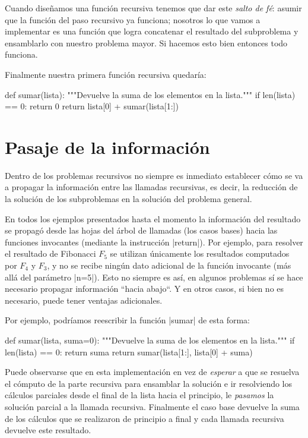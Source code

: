 Cuando diseñamos una función recursiva tenemos que dar este \emph{salto de fé}:
asumir que la función del paso recursivo ya funciona; nosotros lo que vamos a implementar
es una función que logra concatenar el resultado del subproblema y ensamblarlo con
nuestro problema mayor. Si hacemos esto bien entonces todo funciona.

Finalmente nuestra primera función recursiva quedaría:
\begin{codigo-python-sn}
def sumar(lista):
   """Devuelve la suma de los elementos en la lista."""
   if len(lista) == 0:
       return 0
   return lista[0] + sumar(lista[1:])
\end{codigo-python-sn}

\section{Pasaje de la información}

Dentro de los problemas recursivos no siempre es inmediato establecer cómo
se va a propagar la información entre las llamadas recursivas, es decir, la
reducción de la solución de los subproblemas en la solución del problema
general.

En todos los ejemplos presentados hasta el momento la información del resultado
se propagó desde las hojas del árbol de llamadas (los casos bases) hacia las
funciones invocantes (mediante la instrucción |return|). Por ejemplo, para
resolver el resultado de Fibonacci $F_5$ se utilizan únicamente los resultados
computados por $F_4$ y $F_3$, y no se recibe ningún dato adicional de la función
invocante (más allá del parámetro |n=5|).
Esto no siempre es así, en algunos problemas sí se hace necesario propagar
información ``hacia abajo``. Y en otros casos, si bien no es necesario,
puede tener ventajas adicionales.

Por ejemplo, podríamos reescribir la función |sumar| de esta forma:
\begin{codigo-python-sn}
def sumar(lista, suma=0):
    """Devuelve la suma de los elementos en la lista."""
    if len(lista) == 0:
        return suma
    return sumar(lista[1:], lista[0] + suma)
\end{codigo-python-sn}
Puede observarse que en esta implementación en vez de \emph{esperar} a que se
resuelva el cómputo de la parte recursiva para ensamblar la solución e ir
resolviendo los cálculos parciales desde el final de la lista hacia el
principio, le \emph{pasamos} la solución parcial a la llamada recursiva.
Finalmente el caso base devuelve la suma de los cálculos que se realizaron
de principio a final y cada llamada recursiva devuelve este resultado.

